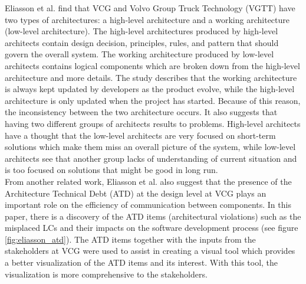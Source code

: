 Eliasson et al. \cite{Eliasson_1} find that VCG and Volvo Group Truck Technology (VGTT) have two types of architectures: a high-level architecture and a working architecture (low-level architecture). The high-level architectures produced by high-level architects contain design decision, principles, rules, and pattern that should govern the overall system. The working architecture produced by low-level architects contains logical components which are broken down from the high-level architecture and more details. The study describes that the working architecture is always kept updated by developers as the product evolve, while the high-level architecture is only updated when the project has started. Because of this reason, the inconsistency between the two architecture occurs. It also suggests that having two different groups of architects results to problems. High-level architects have a thought that the low-level architects are very focused on short-term solutions which make them miss an overall picture of the system, while low-level architects see that another group lacks of understanding of current situation and is too focused on solutions that might be good in long run. \\

From another related work, Eliasson et al. \cite{Eliasson_2} also suggest that the presence of the Architecture Technical Debt (ATD) at the design level at VCG plays an important role on the efficiency of communication between components. In this paper, there is a discovery of the ATD items (architectural violations) such as the misplaced LCs and their impacts on the software development process (see figure \ref{fig:eliasson_atd}). The ATD items together with the inputs from the stakeholders at VCG were used to assist in creating a visual tool which provides a better visualization of the ATD items and its interest. With this tool, the visualization is more comprehensive to the stakeholders. 

